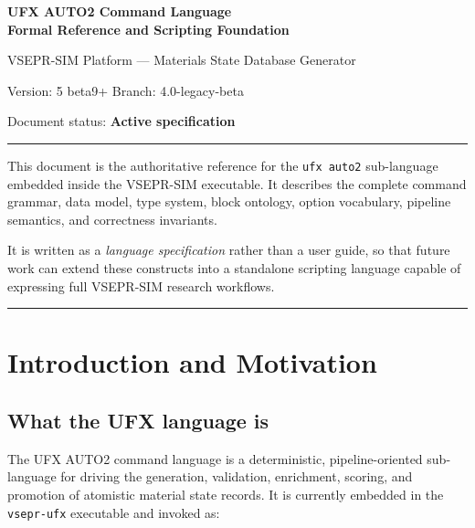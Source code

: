 \documentclass[11pt,letterpaper]{article}
\begin{document}

\begin{titlepage}
\vspace*{2cm}
{\huge\bfseries UFX AUTO2 Command Language\\[0.4em]
\Large Formal Reference and Scripting Foundation\par}
\vspace{1.5cm}
{\large VSEPR-SIM Platform --- Materials State Database Generator\par}
\vspace{0.5cm}
{\normalsize Version: 5 beta9+ \quad Branch: 4.0-legacy-beta\par}
\vspace{0.3cm}
{\normalsize Document status: \textbf{Active specification}\par}
\vspace{2cm}
\hrule
\vspace{0.4cm}
{\small
This document is the authoritative reference for the \texttt{ufx auto2}
sub-language embedded inside the VSEPR-SIM executable.  It describes the
complete command grammar, data model, type system, block ontology, option
vocabulary, pipeline semantics, and correctness invariants.

It is written as a \emph{language specification} rather than a user guide,
so that future work can extend these constructs into a standalone scripting
language capable of expressing full VSEPR-SIM research workflows.
}
\vspace{0.5cm}
\hrule
\end{titlepage}

\tableofcontents
\newpage

\section{Introduction and Motivation}

\subsection{What the UFX language is}

The UFX AUTO2 command language is a deterministic, pipeline-oriented
sub-language for driving the generation, validation, enrichment, scoring,
and promotion of atomistic material state records.  It is currently embedded
in the \texttt{vsepr-ufx} executable and invoked as:
\end{document}
